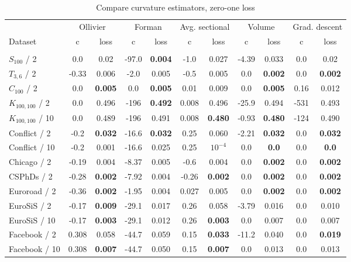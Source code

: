 \documentclass{article} %
\begin{document}
\begin{table}[t]
\caption{Compare curvature estimators, zero-one loss}
\label{tab:compare_zero_one}
\begin{center}
\begin{tabular}{lcccccccc|cc}
&
\multicolumn{2}{c}{Ollivier} &
\multicolumn{2}{c}{Forman} &
\multicolumn{2}{c}{Avg. sectional} &
\multicolumn{2}{c}{Volume} &
\multicolumn{2}{|c}{Grad. descent} 
\\
Dataset & c & loss  & c & loss  & c & loss & c & loss & c & loss  
\\
\hline \\
$S_{100}$ / 2 &
0.0 & 0.02 & 
-97.0 & \textbf{0.004} & 
-1.0 & 0.027 &
-4.39 & 0.033 &
0.0 & 0.02
\\
$T_{3,6}$ / 2 &
-0.33 & 0.006 & 
-2.0 & 0.005 & 
-0.5 & 0.005 & 
0.0 & \textbf{0.002}  &
0.0 & \textbf{0.002}  
\\
$C_{100}$ / 2 & 
0.0 & \textbf{0.005} & 
0.0 & \textbf{0.005} &
0.01 & 0.009 & 
0.0 & \textbf{0.005} &
0.16 & 0.012
\\
$K_{100,100}$ / 2 &
0.0 & 0.496 & 
-196 & \textbf{0.492} & 
0.008 & 0.496 & 
-25.9 & 0.494 & 
-531 & 0.493 
\\
$K_{100,100}$ / 10 &
0.0 & 0.489 & 
-196 & 0.491 & 
0.008 & \textbf{0.480} & 
-0.93 & \textbf{0.480} &
-124 & 0.490 
\\
Conflict / 2 &
-0.2 & \textbf{0.032} &
-16.6 &\textbf{0.032} &
0.25 & 0.060 &
-2.21 & \textbf{0.032} &
0.0 & \textbf{0.032} \\
Conflict / 10 &
-0.2 & 0.001 &
-16.6 &	0.025 &
0.25 & $10^{-4}$ &
0.0 & \textbf{0.0} &
0.0 & \textbf{0.0}  \\
Chicago / 2 &
-0.19 & 0.004 & 
-8.37 & 0.005 & 
-0.6 & 0.004 & 
0.0 & \textbf{0.002} &
0.0 & \textbf{0.002}  \\
CSPhDs / 2 &
-0.28 &	\textbf{0.002} &
-7.92 &	0.004 &
-0.26 & \textbf{0.002} &
0.0 & \textbf{0.002} &
0.0 & \textbf{0.002}  \\
Euroroad / 2 &
-0.36 &	\textbf{0.002} &
-1.95 &	0.004 &
0.027 &	0.005 &
0.0 & \textbf{0.002} &
0.0 & \textbf{0.002} \\
EuroSiS / 2 &
-0.17 & \textbf{0.009} & 
-29.1 & 0.017 & 
0.26 & 0.058 & 
-3.79 & 0.016 &
0.0 & 0.010  \\
EuroSiS / 10 &
-0.17 & \textbf{0.003} & 
-29.1 & 0.012 & 
0.26 & \textbf{0.003} & 
0.0 & 0.007 &
0.0 & 0.007\\
Facebook / 2 &
0.308 & 0.058 & 
-44.7 & 0.059 & 
0.15 & \textbf{0.033} & 
-11.2 & 0.040 &
0.0 & \textbf{0.019} \\
Facebook / 10 &
0.308 & \textbf{0.007} & 
-44.7 & 0.050 & 
0.15 & \textbf{0.007} & 
0.0 & 0.013 &
0.0 & 0.013 \\
\end{tabular}
\end{center}
\end{table}
\end{document}
